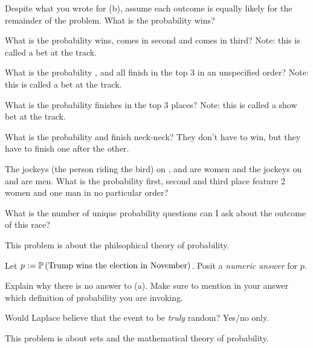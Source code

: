 \documentclass[12pt]{article}
\begin{document}
 Despite what you wrote for (b), assume each outcome is equally likely for the remainder of the problem. What is the probability  wins? 

 What is the probability  wins,  comes in second and  comes in third? Note: this is called a  bet at the track. 


 What is the probability ,  and  all finish in the top 3 in an unspecified order? Note: this is called a  bet at the track. 

 What is the probability  finishes in the top 3 places? Note: this is called a show bet at the track. 

 What is the probability  and  finish neck-neck? They don't have to win, but they have to finish one after the other. 


 The jockeys (the person riding the bird) on ,  and  are women and the jockeys on  and  are men. What is the probability first, second and third place feature 2 women and one man in no particular order? 


 What is the number of unique probability questions can I ask about the outcome of this race? 

\eenum


\problem This problem is about the philsophical theory of probability.

\benum
{} Let $p := \mathbb{P}\left(\text{Trump wins the election in November}\right)$. Posit a \textit{numeric answer} for $p$. 

 Explain why there is no  answer to (a). Make sure to mention in your answer which definition of probability you are invoking. 

 Would Laplace believe that the event  to be \emph{truly} random? Yes/no only. 
\eenum


\problem This problem is about sets and the mathematical theory of probability.

\benum
\end{document}
